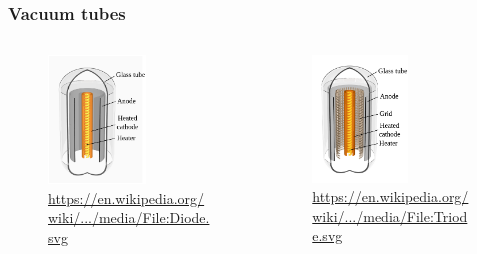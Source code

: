\documentclass{beamer}
\begin{document}
\begin{frame}\frametitle{Vacuum tubes} 
\begin{columns}
\begin{column}{6cm}
\begin{figure}[H]
\centering
\includegraphics[width=0.6\textwidth]{diode}%
\caption{\url{https://en.wikipedia.org/wiki/.../media/File:Diode.svg}}%
\end{figure}
\end{column}
\begin{column}{6cm}
\begin{figure}[H]
\centering
\includegraphics[width=0.6\textwidth]{triode}%
\caption{\url{https://en.wikipedia.org/wiki/.../media/File:Triode.svg}}%
\end{figure}
\end{column}
\end{columns}
\end{frame}
\end{document}

